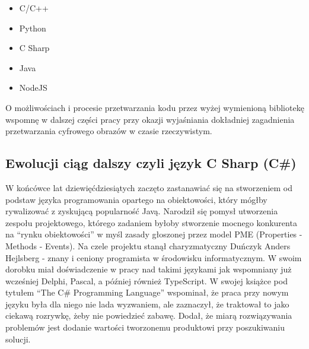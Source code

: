 \documentclass{article}
\begin{document}
	\newline
	\begin{itemize}
		\item C/C++
		\item Python
		\item C Sharp
		\item Java
		\item NodeJS
	\end{itemize}
	O możliwościach i procesie przetwarzania kodu przez wyżej wymienioną bibliotekę wspomnę w dalszej części pracy przy okazji wyjaśniania dokładniej zagadnienia przetwarzania cyfrowego obrazów w czasie rzeczywistym.
	
	\subsection{Ewolucji ciąg dalszy czyli język C Sharp (C#)}
	W końcówce lat dziewięćdziesiątych zaczęto zastanawiać się na stworzeniem od podstaw języka programowania opartego na obiektowości, który mógłby rywalizować z zyskującą popularność Javą. Narodził się pomysł utworzenia zespołu projektowego, którego zadaniem byłoby stworzenie mocnego konkurenta na “rynku obiektowości” w myśl zasady głoszonej przez model PME (Properties - Methods - Events). Na czele projektu stanął charyzmatyczny Duńczyk Anders Hejlsberg - znany i ceniony programista w środowisku informatycznym. W swoim dorobku miał doświadczenie w pracy nad takimi językami jak wspomniany już wcześniej Delphi, Pascal, a później również TypeScript. W swojej książce pod tytułem “The C\# Programming Language” \cite{ref11} wspominał, że praca przy nowym języku była dla niego nie lada wyzwaniem, ale zaznaczył, że traktował to jako ciekawą rozrywkę, żeby nie powiedzieć zabawę. Dodał, że miarą rozwiązywania problemów jest dodanie wartości tworzonemu produktowi przy poszukiwaniu solucji.
\end{document}

